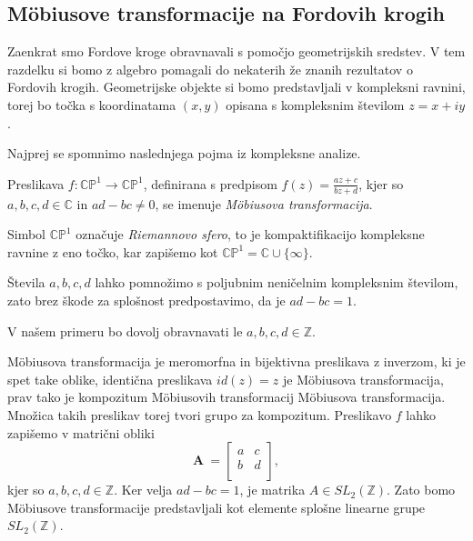 \documentclass[mat1]{fmfdelo}
\begin{document}
\subsection{M\"{o}biusove transformacije na Fordovih krogih}

Zaenkrat smo Fordove kroge obravnavali s pomočjo geometrijskih sredstev. V tem razdelku si bomo z algebro pomagali do nekaterih že znanih rezultatov o Fordovih krogih.
Geometrijske objekte si bomo predstavljali v kompleksni ravnini, torej bo točka s koordinatama $(x,y)$ opisana s kompleksnim številom $z=x+iy$.

Najprej se spomnimo naslednjega pojma iz kompleksne analize.
\begin{definicija}
\label{def:MobTransformacija}
Preslikava \( f \colon \mathbb{CP}^{1} \rightarrow \mathbb{CP}^{1} \), definirana s predpisom \( f(z) = \frac{az+c}{bz+d} \), kjer so $a,b,c,d \in \mathbb{C}$ in $ad-bc \neq 0$, se imenuje \emph{M\"{o}biusova transformacija}.
\end{definicija} 

\begin{opomba}
Simbol $ \mathbb{CP}^{1}$ označuje \emph{Riemannovo sfero}, to je kompaktifikacijo kompleksne ravnine z eno točko, kar zapišemo kot $\mathbb{CP}^{1} = \mathbb{C} \cup \{\infty\}$.
\end{opomba}

\begin{opomba}
Števila $a,b,c,d$ lahko pomnožimo s poljubnim neničelnim kompleksnim številom, zato brez škode za splošnost predpostavimo, da je $ad-bc=1$.

V našem primeru bo dovolj obravnavati le $a,b,c,d \in \mathbb{Z}$.
\end{opomba}

M\"{o}biusova transformacija je meromorfna in bijektivna preslikava z inverzom, ki je spet take oblike, identična preslikava $id(z)=z$ je M\"{o}biusova transformacija, prav tako je kompozitum M\"{o}biusovih transformacij M\"{o}biusova transformacija. Množica takih preslikav torej tvori grupo za kompozitum. 
Preslikavo $f$ lahko zapišemo v matrični obliki
\[
\mathbf{A}\ =
\left[
\begin{array}{cc}
a & c \\
b & d \\
\end{array}
\right],
\]
kjer so $a,b,c,d \in \mathbb{Z}$. Ker velja $ad-bc=1$, je matrika $A \in {SL}_{2}(\mathbb{Z})$. Zato bomo M\"{o}biusove transformacije predstavljali kot elemente splošne linearne grupe ${SL}_{2}(\mathbb{Z})$.
\end{document}
